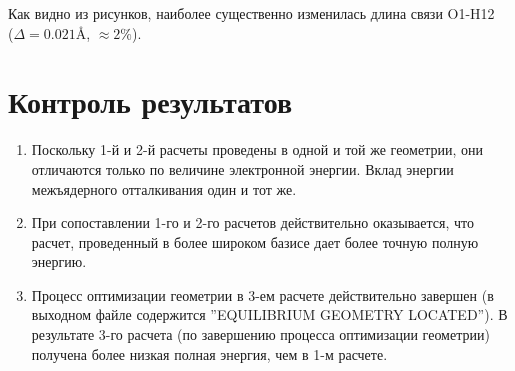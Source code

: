 Как видно из рисунков, наиболее существенно изменилась длина связи O1-H12 \\ ($\Delta = 0.021$\AA, $\approx2\%$).

\newpage
\section{Контроль результатов}
\begin{enumerate}
    \item Поскольку 1-й и 2-й расчеты проведены в одной и той же геометрии, они отличаются только по величине электронной энергии. Вклад энергии межъядерного отталкивания один и тот же.
    \item При сопоставлении 1-го и 2-го расчетов действительно оказывается, что расчет, проведенный в более широком базисе дает более точную полную энергию.
    \item Процесс оптимизации геометрии в 3-ем расчете действительно завершен (в выходном файле содержится ''EQUILIBRIUM GEOMETRY LOCATED''). В результате 3-го расчета (по завершению процесса оптимизации геометрии) получена более низкая полная энергия, чем в 1-м расчете.
\end{enumerate}{}